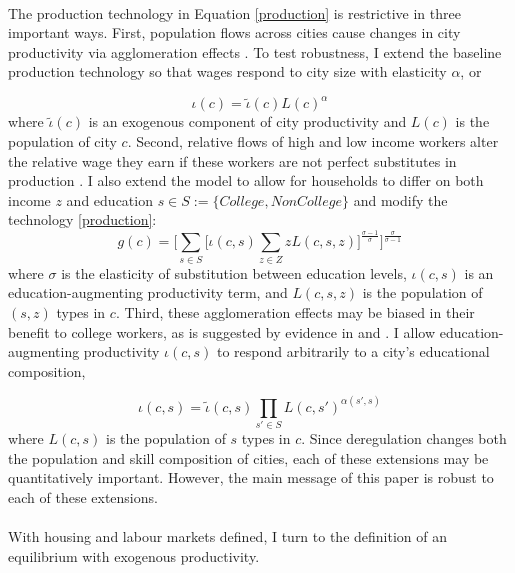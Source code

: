 \documentclass[12pt]{article}
\begin{document}
	\paragraph*{}
	 The production technology in Equation \eqref{production} is restrictive in three important ways. First, population flows across cities cause changes in city productivity via agglomeration effects \citep{Combes_review}. To test robustness, I extend the baseline production technology so that wages respond to city size with elasticity $\alpha$, or 
	 
	 \begin{equation}\label{endoprod}
	 	\iota(c) = \tilde{\iota}(c)L(c)^{\alpha}
	 \end{equation}
	 where $\tilde{\iota}(c)$ is an exogenous component of city productivity and $L(c)$ is the population of city $c$. Second, relative flows of high and low income workers alter the relative wage they earn if these workers are not perfect substitutes in production \citep{card}. I also extend the model to allow for households to differ on both income $z$ and education $s \in S:= \{College, NonCollege\}$ and modify the technology \eqref{production}:
	 \begin{equation}\label{prod_byskill}
	 	g(c) = \bigg[\sum_{s \in S}\big[\iota(c, s)\sum_{z \in Z}zL(c, s, z)\big]^{\frac{\sigma - 1}{\sigma}} \bigg]^{\frac{\sigma}{\sigma - 1}}
	 \end{equation}
	 where $\sigma$ is the elasticity of substitution between education levels, $\iota(c, s)$ is an education-augmenting productivity term, and $L(c, s, z)$ is the population of $(s, z)$ types in $c$. Third, these agglomeration effects may be biased in their benefit to college workers, as is suggested by evidence in \cite{diamond2016} and \cite{ineqincreased}. I allow education-augmenting productivity $\iota(c, s)$ to respond arbitrarily to a city's educational composition,
	 
	 \begin{equation}\label{endoprod_byskill}
	 	\iota(c, s) = \tilde{\iota}(c, s)\prod_{s' \in S}L(c, s')^{\alpha(s', s)}
	 \end{equation} where $L(c, s)$ is the population of $s$ types in $c$. Since deregulation changes both the population and skill composition of cities, each of these extensions may be quantitatively important. However, the main message of this paper is robust to each of these extensions. 
 
	\paragraph*{}
	With housing and labour markets defined, I turn to the definition of an equilibrium with exogenous productivity.
\end{document}
